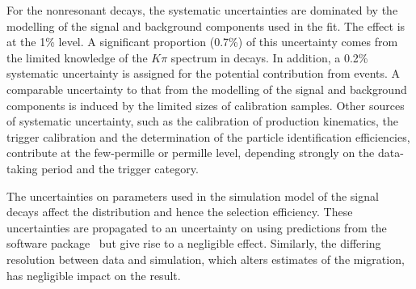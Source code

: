 For the nonresonant \BuKee decays, the systematic uncertainties are dominated by the modelling of the signal and background components used in the fit. The effect is at the 1\% level. A significant proportion (0.7\%) of this  uncertainty comes from the limited knowledge of the $K\pi$ spectrum in \BuBdKpiplusee decays. In addition, a 0.2\% systematic uncertainty is assigned for the potential contribution from \BuBdKpipiplusee events. 
A comparable uncertainty to that from the modelling of the signal and background components is induced by the limited sizes of calibration samples. Other sources of systematic uncertainty, such as the calibration of \Bu production kinematics, the trigger calibration and the determination of the particle identification efficiencies, contribute at the few-permille or permille level, depending strongly on the data-taking period and the trigger category. 



The uncertainties on parameters used in the simulation model of the signal decays affect the \qsq distribution and hence the selection efficiency. These uncertainties are propagated to an uncertainty on \RK using predictions from the {} software package~\cite{Straub:2018kue} but give rise to a negligible effect. Similarly, the differing \qsq resolution between data and simulation, which alters estimates of the \qsq migration, has negligible impact on the result.
